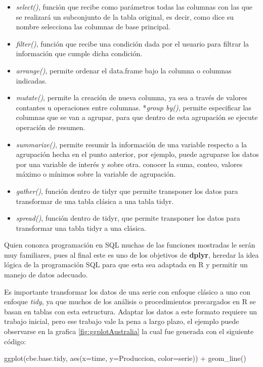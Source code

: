 \documentclass[
  spanish,
]{book}
\newenvironment{Shaded}{\begin{snugshade}}{\end{snugshade}}
\newcommand{\AttributeTok}[1]{\textcolor[rgb]{0.77,0.63,0.00}{#1}}
\newcommand{\FunctionTok}[1]{\textcolor[rgb]{0.00,0.00,0.00}{#1}}
\newcommand{\NormalTok}[1]{#1}
\newcommand{\SpecialCharTok}[1]{\textcolor[rgb]{0.00,0.00,0.00}{#1}}
\providecommand{\tightlist}{%
  \setlength{\itemsep}{0pt}\setlength{\parskip}{0pt}}
\theoremstyle{remark}
\begin{document}
\begin{itemize}
\tightlist
\item
  \emph{select()}, función que recibe como parámetros todas las columnas con las que se realizará un subconjunto de la tabla original, es decir, como dice su nombre selecciona las columnas de base principal.
\item
  \emph{filter()}, función que recibe una condición dada por el usuario para filtrar la información que cumple dicha condición.
\item
  \emph{arrange()}, permite ordenar el data.frame bajo la columna o columnas indicadas.
\item
  \emph{mutate()}, permite la creación de nueva columna, ya sea a través de valores contantes u operaciones entre columnas.
  *\emph{group by()}, permite especificar las columnas que se van a agrupar, para que dentro de esta agrupación se ejecute operación de resumen.
\item
  \emph{summarize()}, permite resumir la información de una variable respecto a la agrupación hecha en el punto anterior, por ejemplo, puede agruparse los datos por una variable de interés y sobre otra. conocer la suma, conteo, valores máximo o mínimos sobre la variable de agrupación.
\item
  \emph{gather()}, función dentro de tidyr que permite transponer los datos para transformar de una tabla clásica a una tabla tidyr.
\item
  \emph{spread()}, función dentro de tidyr, que permite transponer los datos para transformar una tabla tidyr a una clásica.
\end{itemize}

Quien conozca programación en SQL muchas de las funciones mostradas le serán muy familiares, pues al final este es uno de los objetivos de \textbf{dplyr}, heredar la idea lógica de la programación SQL para que esta sea adaptada en R y permitir un manejo de datos adecuado.

Es importante transformar los datos de una serie con enfoque clásico a uno con enfoque \emph{tidy}, ya que muchos de los análisis o procedimientos precargados en R se basan en tablas con esta estructura. Adaptar los datos a este formato requiere un trabajo inicial, pero ese trabajo vale la pena a largo plazo, el ejemplo puede observarse en la grafica \ref{fig:ggplotAustralia} la cual fue generada con el siguiente código:

\begin{Shaded}
\begin{Highlighting}[]
\FunctionTok{ggplot}\NormalTok{(cbe.base.tidy, }\FunctionTok{aes}\NormalTok{(}\AttributeTok{x=}\NormalTok{time, }\AttributeTok{y=}\NormalTok{Produccion, }\AttributeTok{color=}\NormalTok{serie)) }\SpecialCharTok{+}
  \FunctionTok{geom\_line}\NormalTok{()}
\end{Highlighting}
\end{Shaded}
\end{document}
